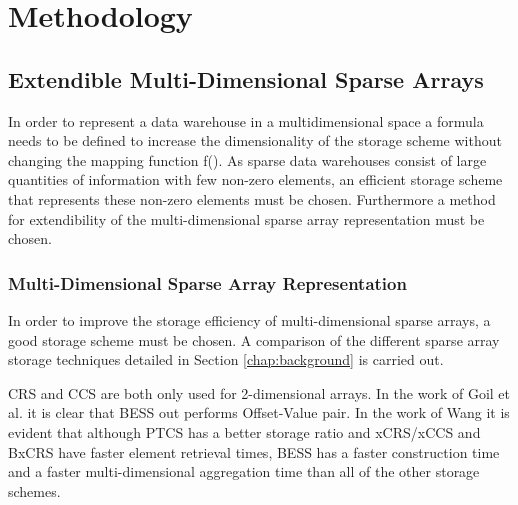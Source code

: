 %
%
%
%   
%
%
\chapter{Methodology} \label{chap:methodology}


\section{Extendible Multi-Dimensional Sparse Arrays}

In order to represent a data warehouse in a multidimensional space a formula needs to be defined to increase the dimensionality of the storage scheme without changing the mapping function f(). As sparse data warehouses consist of large quantities of information with few non-zero elements, an efficient storage scheme that represents these non-zero elements must be chosen. Furthermore a method for extendibility of the multi-dimensional sparse array representation must be chosen.

\subsection{Multi-Dimensional Sparse Array Representation}
In order to improve the storage efficiency of multi-dimensional sparse arrays, a good storage scheme must be chosen. A comparison of the different sparse array storage techniques detailed in Section \ref{chap:background} is carried out.

CRS and CCS are both only used for 2-dimensional arrays. In the work of Goil et al. \cite{goil:bess} it is clear that BESS out performs Offset-Value pair. In the work of Wang \cite{wang:2014sar} it is evident that although PTCS has a better storage ratio and xCRS/xCCS and BxCRS have faster element retrieval times, BESS has a faster construction time and a faster multi-dimensional aggregation time than all of the other storage schemes. 

